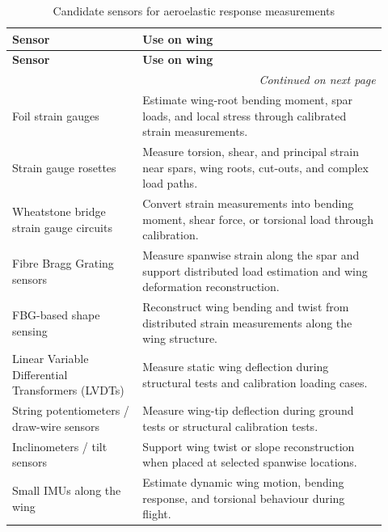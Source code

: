 \begin{longtable}{|p{0.32\linewidth}|p{0.60\linewidth}|}
\caption{Candidate sensors for aeroelastic response measurements}
\label{wing_structural_sensors} \\

\hline
\textbf{Sensor} & \textbf{Use on wing} \\
\hline\hline
\endfirsthead

\hline\hline
\textbf{Sensor} & \textbf{Use on wing} \\
\hline\hline
\endhead

\hline
\multicolumn{2}{r}{\textit{Continued on next page}} \\
\endfoot

\hline
\endlastfoot

Foil strain gauges 
& Estimate wing-root bending moment, spar loads, and local stress through calibrated strain measurements. \\
\hline

Strain gauge rosettes 
& Measure torsion, shear, and principal strain near spars, wing roots, cut-outs, and complex load paths. \\
\hline

Wheatstone bridge strain gauge circuits 
& Convert strain measurements into bending moment, shear force, or torsional load through calibration. \\
\hline

Fibre Bragg Grating sensors 
& Measure spanwise strain along the spar and support distributed load estimation and wing deformation reconstruction. \\
\hline

FBG-based shape sensing 
& Reconstruct wing bending and twist from distributed strain measurements along the wing structure. \\
\hline

Linear Variable Differential Transformers (LVDTs)
& Measure static wing deflection during structural tests and calibration loading cases. \\
\hline

String potentiometers / draw-wire sensors 
& Measure wing-tip deflection during ground tests or structural calibration tests. \\
\hline

Inclinometers / tilt sensors 
& Support wing twist or slope reconstruction when placed at selected spanwise locations. \\
\hline

Small IMUs along the wing 
& Estimate dynamic wing motion, bending response, and torsional behaviour during flight. \\
\hline


\end{longtable}
